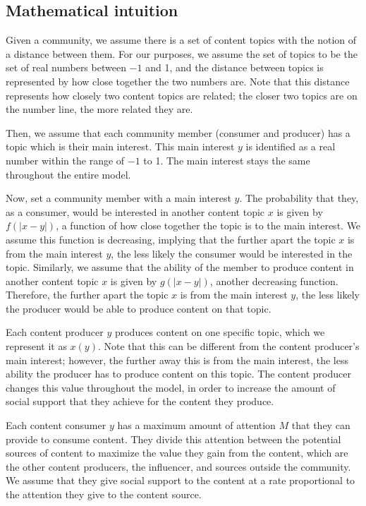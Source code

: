 \documentclass[11pt, letterpaper]{article}
\begin{document}
\subsection{Mathematical intuition}

Given a community, we assume there is a set of content topics with the notion of a distance between them. For our purposes, we assume the set of topics to be the set of real numbers between \(-1\) and 1, and the distance between topics is represented by how close together the two numbers are. Note that this distance represents how closely two content topics are related; the closer two topics are on the number line, the more related they are.

Then, we assume that each community member (consumer and producer) has a topic which is their main interest. This main interest \(y\) is identified as a real number within the range of \(-1\) to 1. The main interest stays the same throughout the entire model.

Now, set a community member with a main interest \(y\). The probability that they, as a consumer, would be interested in another content topic \(x\) is given by \(f(|x-y|)\), a function of how close together the topic is to the main interest. We assume this function is decreasing, implying that the further apart the topic \(x\) is from the main interest \(y\), the less likely the consumer would be interested in the topic. Similarly, we assume that the ability of the member to produce content in another content topic \(x\) is given by \(g(|x-y|)\), another decreasing function. Therefore, the further apart the topic \(x\) is from the main interest \(y\), the less likely the producer would be able to produce content on that topic.

Each content producer \(y\) produces content on one specific topic, which we represent it as \(x(y)\). Note that this can be different from the content producer's main interest; however, the further away this is from the main interest, the less ability the producer has to produce content on this topic. The content producer changes this value throughout the model, in order to increase the amount of social support that they achieve for the content they produce. 

Each content consumer \(y\) has a maximum amount of attention \(M\) that they can provide to consume content. They divide this attention between the potential sources of content to maximize the value they gain from the content, which are the other content producers, the influencer, and sources outside the community. We assume that they give social support to the content at a rate proportional to the attention they give to the content source. 
\end{document}
